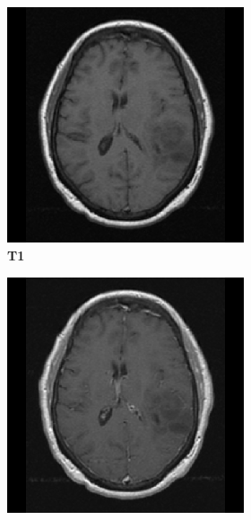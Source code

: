 \begin{subappendices}
\begin{figure}
    \centering
    \begin{subfigure}[b]{0.77\textwidth}
        \centering
        \begin{subfigure}[b]{0.24\textwidth}
        \includegraphics[width=\textwidth]{Figures/TCGA-DU-6400_T1.png}
        \caption*{\normalfont \textbf{\acrshort{T1}}\nopunct}
        \end{subfigure}
        \hfill
        \begin{subfigure}[b]{0.24\textwidth}
        \includegraphics[width=\textwidth]{Figures/TCGA-DU-6400_T1GD.png}

\end{subfigure}
\end{subfigure}
\end{figure}
\end{subappendices}
